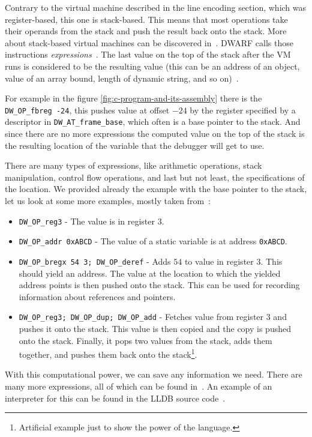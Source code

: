 Contrary to the virtual machine described in the line encoding section, which
was register-based, this one is stack-based. This means that most operations
take their operands from the stack and push the result back onto the stack.
More about stack-based virtual machines can be discovered
in~\cite{crafting-interpreters}. DWARF calls those instructions
\textit{expressions}~\cite{dwarf}. The last value on the top of the stack after
the VM runs is considered to be the resulting value (this can be an address of
an object, value of an array bound, length of dynamic string, and so
on)~\cite{dwarf}.

For example in the figure \ref{fig:c-program-and-its-assembly} there is the
\verb|DW_OP_fbreg -24|, this pushes value at offset $-24$ by the register
specified by a descriptor in \verb|DW_AT_frame_base|, which often is a base
pointer to the stack. And since there are no more expressions the computed
value on the top of the stack is the resulting location of the variable that
the debugger will get to use.

There are many types of expressions, like arithmetic operations, stack
manipulation, control flow operations, and last but not least, the
specifications of the location. We provided already the example with the base
pointer to the stack, let us look at some more examples, mostly taken
from~\cite{dwarf}:
\begin{itemize}
    \item \verb|DW_OP_reg3| - The value is in register $3$.
    \item \verb|DW_OP_addr 0xABCD| - The value of a static variable is at
        address \verb|0xABCD|.
    \item \verb|DW_OP_bregx 54 3; DW_OP_deref| - Adds $54$ to value in
        register $3$. This should yield an address. The value at the location
        to which the yielded address points is then pushed onto the stack. This
        can be used for recording information about references and pointers.
    \item \verb|DW_OP_reg3; DW_OP_dup; DW_OP_add| - Fetches value from
        register $3$ and pushes it onto the stack. This value is then copied
        and the copy is pushed onto the stack. Finally, it pops two values from
        the stack, adds them together, and pushes them back onto the
        stack\footnote{Artificial example just to show the power of the
        language.}.
\end{itemize}

With this computational power, we can save any information we need. There are
many more expressions, all of which can be found in~\cite{dwarf}. An example of
an interpreter for this can be found in the LLDB source code~\cite{lldb-vm}.

